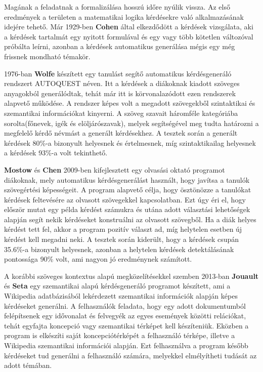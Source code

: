 
Magának a feladatnak a formalizálása hosszú időre nyúlik vissza. Az első eredmények a területen a matematikai logika kérdésekre való alkalmazásának idejére tehető. Már 1929-ben \textbf{Cohen} által elkezdődött a kérdések vizsgálata, aki a kérdések tartalmát egy nyitott formulával és egy vagy több kötetlen változóval próbálta leírni\cite{question_generation}, azonban a kérdések automatikus generálása mégis egy még frissnek mondható témakör.

1976-ban \textbf{Wolfe} készített egy tanulást segítő automatikus kérdésgeneráló rendszert AUTOQUEST néven.\cite{autoquest} Itt a kérdések a diákoknak kiadott szöveges anyagokból generálódtak, tehát már itt is körvonalazódott ezen rendszerek alapvető működése. A rendszer képes volt a megadott szövegekből szintaktikai és szemantikai információkat kinyerni. A szöveg szavait háromféle kategóriába sorolta(főnevek, igék és elöljárószavak), melyek segítségével meg tudta határozni a megfelelő kérdő névmást a generált kérdésekhez. A tesztek során a generált kérdések 80\%-a bizonyult helyesnek és értelmesnek, míg szintaktikailag helyesnek a kérdések 93\%-a volt tekinthető.

\textbf{Mostow} és \textbf{Chen} 2009-ben kifejlesztett egy olvasási oktató programot diákoknak, mely automatikus kérdésgenerálást használt, hogy javítsa a tanulók szövegértési képességeit.\cite{reading_tutor} A program alapvető célja, hogy ösztönözze a tanulókat kérdések feltevésére az olvasott szövegekkel kapcsolatban. Ezt úgy éri el, hogy először mutat egy példa kérdést számukra és utána adott választási lehetőségek alapján segít nekik kérdéseket konstruálni az olvasott szövegből. Ha a diák helyes kérdést tett fel, akkor a program pozitív választ ad, míg helytelen esetben új kérdést kell megadni neki. A tesztek során kiderült, hogy a kérdések csupán 35.6\%-a bizonyult helyesnek, azonban a helytelen kérdések detektálásának pontossága 90\% volt, ami nagyon jó eredménynek számított.

A korábbi szöveges kontextus alapú megközelítésekkel szemben 2013-ban \textbf{Jouault} és \textbf{Seta} egy szemantikai alapú kérdésgeneráló programot készített, ami a Wikipedia adatbázisából lekérdezett szemantikai információk alapján képes kérdéseket generálni.\cite{wiki_qg} A felhasználók feladata, hogy egy adott dokumentumból felépítsenek egy idővonalat és felvegyék az egyes események közötti relációkat, tehát egyfajta koncepció vagy szemantikai térképet kell készíteniük. Eközben a program is elkészíti saját koncepciótérképét a felhasználó térképe, illetve a Wikipedia szemantikai információi alapján. Ezt felhasználva a program később kérdéseket tud generálni a felhasználó számára, melyekkel elmélyítheti tudását az adott témában.

